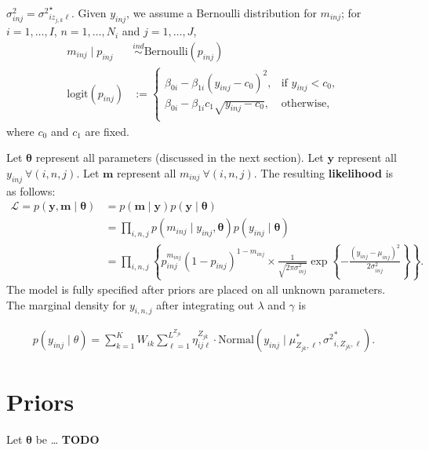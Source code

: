 \documentclass[12pt]{article}
\newcommand{\bc}[1]{ \left\{#1\right\} }
\newcommand{\N}{ \mathcal{N} }
\newcommand{\ind}{\overset{ind}{\sim}}
\def\logit{\text{logit}}
\def\Bern{\text{Bernoulli}}
\def\N{\text{Normal}}
\def\btheta{\bm{\theta}}
\def\y{\bm{y}}
\newcommand\m{\bm{m}}
\begin{document}
$\sigma^2_{inj} = {\sigma^{2}}^\star_{iz_{j,k}\ell}$. Given
$y_{inj}$, we assume a Bernoulli distribution for $m_{inj}$; for
$i=1, \ldots, I$, $n=1, \ldots, N_i$ and $j=1, \ldots, J$,
%
\begin{align*}
  m_{inj} \mid p_{inj} &\ind \Bern(p_{inj}) \\
  \logit(p_{inj}) &:= \begin{cases}
  \beta_{0i} - \beta_{1i}(y_{inj}-c_0)^2, & \text{if } y_{inj} < c_0\nonumber, \\
  \beta_{0i} - \beta_{1i}c_1\sqrt{y_{inj}-c_0}, & \text{otherwise}, \nonumber \\
  \end{cases}
\end{align*}
where $c_0$ and $c_1$ are fixed.

Let $\btheta$ represent all parameters (discussed in the next
section). Let $\y$ represent all $y_{inj} ~ \forall(i,n,j)$. Let
$\m$ represent all $m_{inj} ~ \forall(i,n,j)$. The resulting \textbf{likelihood} is as follows:
\begin{align}
\mathcal{L} = p(\y, \m \mid \btheta) &= p(\m \mid \y) p(\y \mid \btheta) \nonumber\\
&= \prod_{i,n,j} p(m_{inj} \mid y_{inj}, \btheta) p(y_{inj} \mid \btheta) \nonumber\\
&= \prod_{i,n,j} \bc{
  p_{inj}^{m_{inj}} (1-p_{inj})^{1-m_{inj}} \times 
   \frac{1}{\sqrt{2\pi\sigma^2_{inj}}} \exp\bc{-\frac{(y_{inj}-\mu_{inj})^2}{2\sigma^2_{inj}}}
}.
\end{align}
The model is fully specified after priors are placed on all unknown
parameters. The marginal density for $y_{i,n,j}$ after integrating out
$\lambda$ and $\gamma$ is

\begin{align}
p(y_{inj} \mid \theta) = \sum_{k=1}^K W_{ik} \sum_{\ell=1}^{L^{Z_{jk}}}
\eta^{Z_{jk}}_{ij\ell} \cdot \N(y_{inj} \mid \mu^*_{Z_{jk}, \ell}, {\sigma^2}^*_{i,Z_{jk},\ell}).
\end{align}

\section{Priors}\label{priors}

Let $\bm\theta$ be \ldots{} \textbf{TODO}
\end{document}
